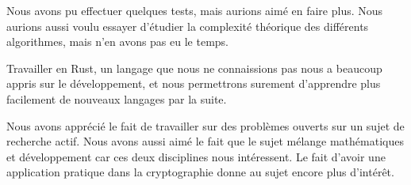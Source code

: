 \documentclass[12pt, a4paper, oneside]{memoir}
\begin{document}
Nous avons pu effectuer quelques tests, mais aurions aimé en faire plus. Nous aurions aussi voulu essayer d'étudier la complexité théorique des différents algorithmes, mais n'en avons pas eu le temps.

Travailler en Rust, un langage que nous ne connaissions pas nous a beaucoup appris sur le développement, et nous permettrons surement d'apprendre plus facilement de nouveaux langages par la suite.

Nous avons apprécié le fait de travailler sur des problèmes ouverts sur un sujet de recherche actif. Nous avons aussi aimé le fait que le sujet mélange mathématiques et développement car ces deux disciplines nous intéressent. Le fait d'avoir une application pratique dans la cryptographie donne au sujet encore plus d'intérêt.
%



%
\end{document}
